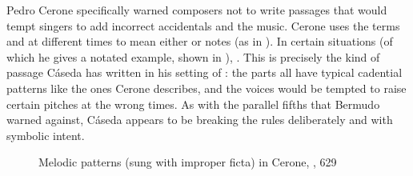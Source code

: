 Pedro Cerone specifically warned composers not to write passages that would
tempt singers to add incorrect accidentals and  the music.
Cerone uses the terms  and  at different
times to mean either  or  notes (as in
).
In certain situations (of which he gives a notated example, shown in
), .%
    \Autocite[629]{Cerone:Melopeo}
This is precisely the kind of passage Cáseda has written in his setting of
: the parts all have typical cadential patterns like
the ones Cerone describes, and the voices would be tempted to raise certain
pitches at the wrong times. 
As with the parallel fifths that Bermudo warned against, Cáseda appears to be
breaking the rules deliberately and with symbolic intent.


\begin{figure}
    \caption{Melodic patterns  (sung with
    improper ficta) in Cerone, , 629} 
    \label{fig:Cerone-false_cadences}
\end{figure}

